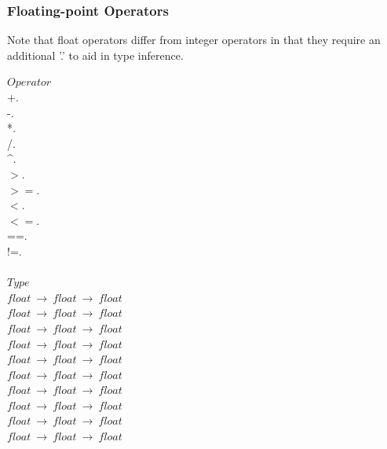 \documentclass[5pt]{article}
\begin{document}
\subsubsection{Floating-point Operators}
Note that float operators differ from integer operators in that they require an additional '.' to aid in type inference.
\begin{multicols}{3}
\noindent $Operator$ \\
\hspace*{5mm} +. \\
\hspace*{5mm} -. \\
\hspace*{5mm} *. \\
\hspace*{5mm} /. \\
\hspace*{5mm} \^{}. \\
\hspace*{5mm} $>$. \\
\hspace*{5mm} $>=$. \\
\hspace*{5mm} $<$. \\
\hspace*{5mm} $<=$. \\
\hspace*{5mm} ==. \\
\hspace*{5mm} !=. \\
\columnbreak \\
\noindent $Type$ \\
$float \ \rightarrow \ float \ \rightarrow \ float $ \\
$float \ \rightarrow \ float \ \rightarrow \ float $ \\
$float \ \rightarrow \ float \ \rightarrow \ float $ \\
$float \ \rightarrow \ float \ \rightarrow \ float $ \\
$float \ \rightarrow \ float \ \rightarrow \ float $ \\
$float \ \rightarrow \ float \ \rightarrow \ float $ \\
$float \ \rightarrow \ float \ \rightarrow \ float $ \\
$float \ \rightarrow \ float \ \rightarrow \ float $ \\
$float \ \rightarrow \ float \ \rightarrow \ float $ \\
$float \ \rightarrow \ float \ \rightarrow \ float $ \\

\end{multicols}
\end{document}
